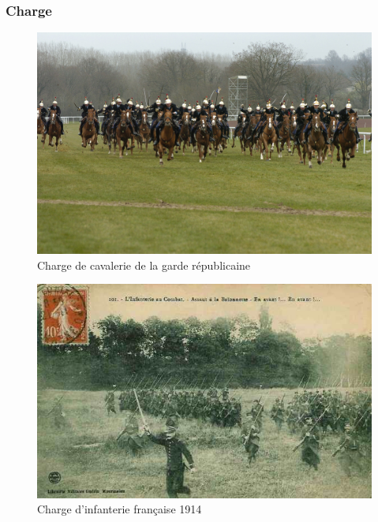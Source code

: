 \documentclass{article}
\begin{document}
\subsubsection{Charge}
\begin{figure}[H]
	\begin{centering}
	\includegraphics[width=\linewidth]{../ressources/Charge-de-cavalerie}
	\caption{Charge de cavalerie de la garde républicaine \cite{charge_cavalery}}
	\end{centering}
\end{figure}
\begin{figure}[H]
	\begin{centering}
	\includegraphics[width=\linewidth]{../ressources/charge_infanterie}
	\caption{Charge d’infanterie française 1914 \cite{infantery_charge}}
	\end{centering}
\end{figure}
\cite{charge_tactic}
\end{document}
